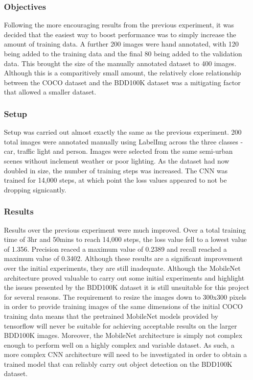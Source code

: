 \documentclass[12pt]{report}
\begin{document}
\subsubsection{Objectives}
\begin{flushleft}
Following the more encouraging results from the previous experiment, it was decided that the easiest way to boost performance was to simply increase the amount of training data. A further 200 images were hand annotated, with 120 being added to the training data and the final 80 being added to the validation data. This brought the size of the manually annotated dataset to 400 images. Although this is a comparitively small amount, the relatively close relationship between the COCO dataset and the BDD100K dataset was a mitigating factor that allowed a smaller dataset.
\end{flushleft}

\subsubsection{Setup}
\begin{flushleft}
Setup was carried out almost exactly the same as the previous experiment. 200 total images were annotated manually using LabelImg across the three classes - car, traffic light and person. Images were selected from the same semi-urban scenes without inclement weather or poor lighting. As the dataset had now doubled in size, the number of training steps was increased. The CNN was trained for 14,000 steps, at which point the loss values appeared to not be dropping signicantly.
\end{flushleft}

\subsubsection{Results}
\begin{flushleft}
Results over the previous experiment were much improved. Over a total training time of 3hr and 50mins to reach 14,000 steps, the loss value fell to a lowest value of 1.356. Precision reaced a maximum value of 0.2389 and recall reached a maximum value of 0.3402. Although these results are a significant improvement over the initial experiments, they are still inadequate. Although the MobileNet architecture proved valuable to carry out some initial experiments and highlight the issues presented by the BDD100K dataset it is still unsuitable for this project for several reasons. The requirement to resize the images down to 300x300 pixels in order to provide training images of the same dimensions of the initial COCO training data means that the pretrained MobileNet models provided by tensorflow will never be suitable for achieving acceptable results on the larger BDD100K images. Moreover, the MobileNet architecture is simply not complex enough to perform well on a highly complex and variable dataset. As such, a more complex CNN architecture will need to be investigated in order to obtain a trained model that can reliably carry out object detection on the BDD100K dataset.
\end{flushleft}
\end{document}
